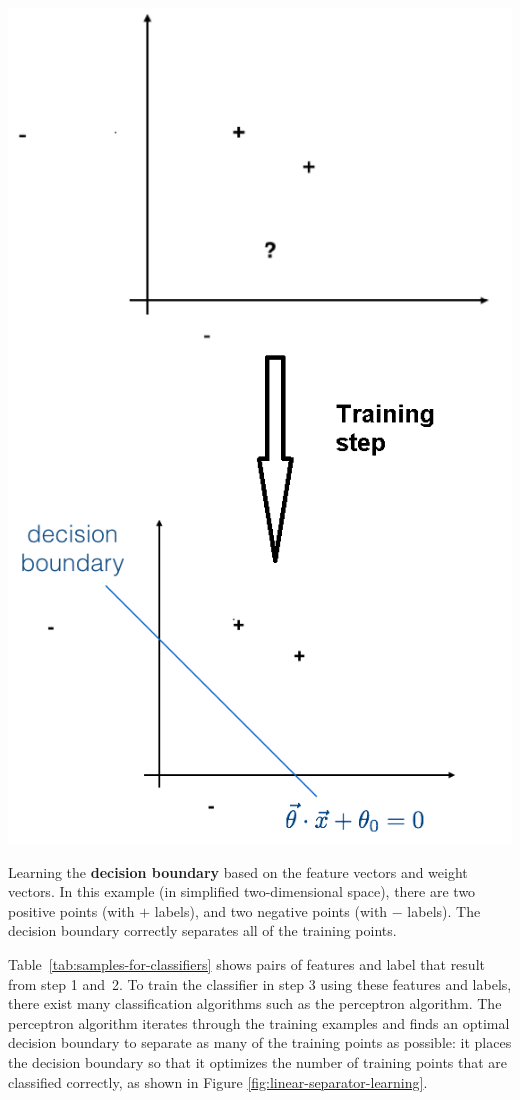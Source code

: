 \documentclass[justified, marginals=justified]{tufte-handout}
\begin{document}
\begin{marginfigure}
  \includegraphics[width=\linewidth]{linear-separator-learning.png}
  \caption{Learning the \textbf{decision boundary} based on the feature vectors and weight vectors. In this example (in simplified two-dimensional space), there are two positive points (with $+$ labels), and two negative points (with $-$ labels). The decision boundary correctly separates all of the training points.}
  \label{fig:linear-separator-learning}
\end{marginfigure}


Table~\ref{tab:samples-for-classifiers} shows pairs of features and label that result from step 1 and~2. To train the classifier in step 3 using these features and labels, there exist many classification algorithms such as the perceptron algorithm. The perceptron algorithm iterates through the training examples and finds an optimal decision boundary to separate as many of the training points as possible: it places the decision boundary so that it optimizes the number of training points that are classified correctly, as shown in Figure \ref{fig:linear-separator-learning}. 
\end{document}

